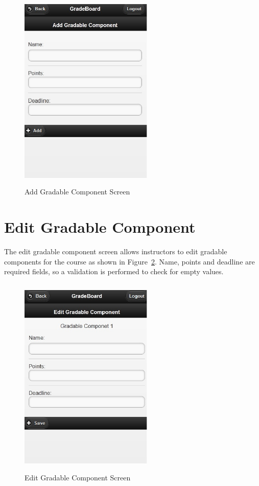 \vspace{3em}
\begin{figure}[H]
\begin{center}
\includegraphics[height=3.8in,width=2.5in]{images/addgradablecomponent_screen.jpg}
\caption{Add Gradable Component Screen}
\label{fig:addgradablecomponent_screen}
\end{center}
\end{figure}

\newpage
\section{Edit Gradable Component}
The edit gradable component screen allows instructors to edit gradable components for the course as shown in Figure~\ref{fig:editgradablecomponent_screen}. Name, points and deadline are required fields, so a validation is performed to check for empty values.
\vspace{3em}
\begin{figure}[H]
\begin{center}
\includegraphics[height=3.8in,width=2.5in]{images/editgradablecomponent_screen.jpg}
\caption{Edit Gradable Component Screen}
\label{fig:editgradablecomponent_screen}
\end{center}
\end{figure}